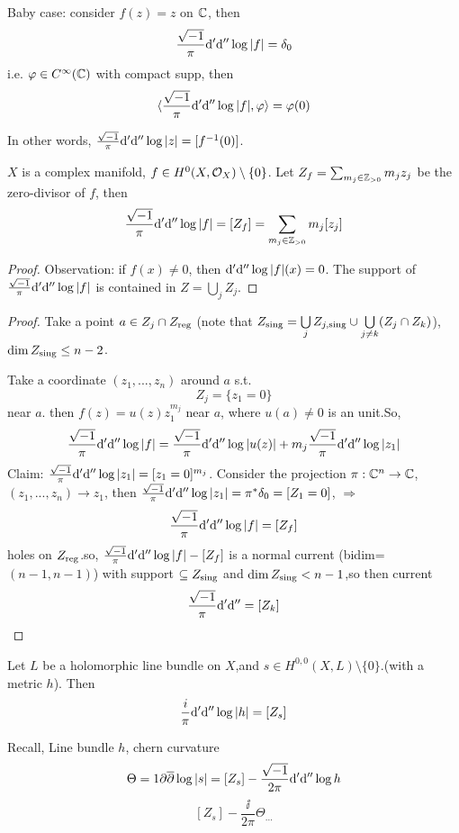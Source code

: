 Baby case: consider $f(z)=z$ on $\mathbb{C}$, then
$$\frac{\sqrt{-1}}{\pi}\mathrm{d}'\mathrm{d}''\log|f|=\delta_0$$
i.e. $\varphi\in C^\infty(\mathbb{C})$ with compact supp, then
$$\langle \frac{\sqrt{-1}}{\pi}\mathrm{d}'\mathrm{d}''\log|f|,\varphi \rangle=\varphi(0)$$

In other words, $\frac{\sqrt{-1}}{\pi}\mathrm{d}'\mathrm{d}''\log|z|=[f^{-1}(0)]$.

\begin{thm}$X$ is a complex manifold, $f\in H^0(X,\mathcal{O}_X)\setminus\{0\}$.
Let $Z_f=\sum_{m_j\in\mathbb{Z}_{>0}} m_jz_j$ be the zero-divisor of $f$,
then
$$
  \frac{\sqrt{-1}}{\pi}\mathrm{d}'\mathrm{d}''\log|f|
=
  [Z_f]
=
  \sum_{m_j\in\mathbb{Z}_{>0}}m_j[z_j]
$$
\end{thm}

\begin{proof}
Observation: if $f(x)\neq 0$, then $\mathrm{d}'\mathrm{d}''\log|f|(x)=0$.
The support of $\frac{\sqrt{-1}}{\pi}\mathrm{d}'\mathrm{d}''\log|f|$
is contained in $Z=\bigcup\limits_j Z_j$.
\end{proof}

\begin{proof}

Take a point $a\in Z_j\cap Z_{\operatorname{reg}}$
(note that $Z_{\operatorname{sing}}=\bigcup\limits_{j} Z_{j,\operatorname{sing}}
\cup\bigcup\limits_{j\neq k}(Z_j\cap Z_k)$),
$\dim Z_{\operatorname{sing}}\leq n-2$.

Take a coordinate $(z_1,...,z_n)$ around $a$ s.t.
$$Z_j=\{z_1=0\}$$
near $a$. then $f(z)=u(z)z_1^{m_j}$ near $a$,
where $u(a)\neq 0$ is an unit.So,
$$
  \frac{\sqrt{-1}}{\pi}\mathrm{d}'\mathrm{d}''\log|f|
=\frac{\sqrt{-1}}{\pi}\mathrm{d}'\mathrm{d}''\log|u(z)|+ m_j
\frac{\sqrt{-1}}{\pi}\mathrm{d}'\mathrm{d}''\log|z_1|
$$
Claim: $\frac{\sqrt{-1}}{\pi}\mathrm{d}'\mathrm{d}''\log|z_1|=[z_1=0]^{m_j}$.
Consider the projection $\pi:\mathbb{C}^n\to\mathbb{C}$,
$(z_1,...,z_n)\to z_1$, then
$\frac{\sqrt{-1}}{\pi}\mathrm{d}'\mathrm{d}''\log|z_1|=\pi^*\delta_0=[Z_1=0]$,
$\Rightarrow$
$$
  \frac{\sqrt{-1}}{\pi}\mathrm{d}'\mathrm{d}''\log|f|
=[Z_f]
$$
holes on $Z_{\operatorname{reg}}$.so, $\frac{\sqrt{-1}}{\pi}\mathrm{d}'\mathrm{d}''\log|f|-[Z_f]$
is a normal current (bidim= $(n-1,n-1)$)
with support $\subseteq Z_{\operatorname{sing}}$ and
$\dim Z_{\operatorname{sing}}<n-1$,so then current
$$\frac{\sqrt{-1}}{\pi}\mathrm{d}'\mathrm{d}''=[Z_k]$$

\end{proof}

\begin{cor}Let $L$ be a holomorphic line bundle on $X$,and
$s\in H^{0,0}(X,L)\setminus\{0\}$.(with a metric $h$).
Then
$$
  \frac{\-i}{\pi}\mathrm{d}'\mathrm{d}''\log|h|
=[Z_s]
$$
\end{cor}

Recall, Line bundle $h$, chern curvature
$$\Theta=1\partial\overline{\partial}\log|s|=[Z_s]-
\frac{\sqrt{-1}}{2\pi}\mathrm{d}'\mathrm{d}''\log h$$
$$[Z_s]-\frac{\ii}{2\pi}\Theta_{...}$$


